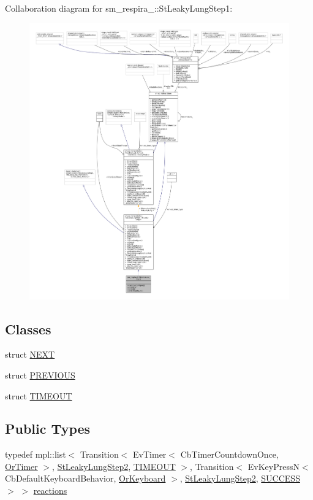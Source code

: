 Collaboration diagram for sm\+\_\+respira\+\_\+:\+:St\+Leaky\+Lung\+Step1\+:
\nopagebreak
\begin{figure}[H]
\begin{center}
\leavevmode
\includegraphics[width=350pt]{structsm__respira__1_1_1StLeakyLungStep1__coll__graph}
\end{center}
\end{figure}
\subsection*{Classes}
\begin{DoxyCompactItemize}
\item 
struct \hyperlink{structsm__respira__1_1_1StLeakyLungStep1_1_1NEXT}{N\+E\+XT}
\item 
struct \hyperlink{structsm__respira__1_1_1StLeakyLungStep1_1_1PREVIOUS}{P\+R\+E\+V\+I\+O\+US}
\item 
struct \hyperlink{structsm__respira__1_1_1StLeakyLungStep1_1_1TIMEOUT}{T\+I\+M\+E\+O\+UT}
\end{DoxyCompactItemize}
\subsection*{Public Types}
\begin{DoxyCompactItemize}
\item 
typedef mpl\+::list$<$ Transition$<$ Ev\+Timer$<$ Cb\+Timer\+Countdown\+Once, \hyperlink{classsm__respira__1_1_1OrTimer}{Or\+Timer} $>$, \hyperlink{structsm__respira__1_1_1StLeakyLungStep2}{St\+Leaky\+Lung\+Step2}, \hyperlink{structsm__respira__1_1_1StLeakyLungStep1_1_1TIMEOUT}{T\+I\+M\+E\+O\+UT} $>$, Transition$<$ Ev\+Key\+PressN$<$ Cb\+Default\+Keyboard\+Behavior, \hyperlink{classsm__respira__1_1_1OrKeyboard}{Or\+Keyboard} $>$, \hyperlink{structsm__respira__1_1_1StLeakyLungStep2}{St\+Leaky\+Lung\+Step2}, \hyperlink{classSUCCESS}{S\+U\+C\+C\+E\+SS} $>$ $>$ \hyperlink{structsm__respira__1_1_1StLeakyLungStep1_a7db4fb4dc25a1c7b41ed9b364445ddec}{reactions}
\end{DoxyCompactItemize}
